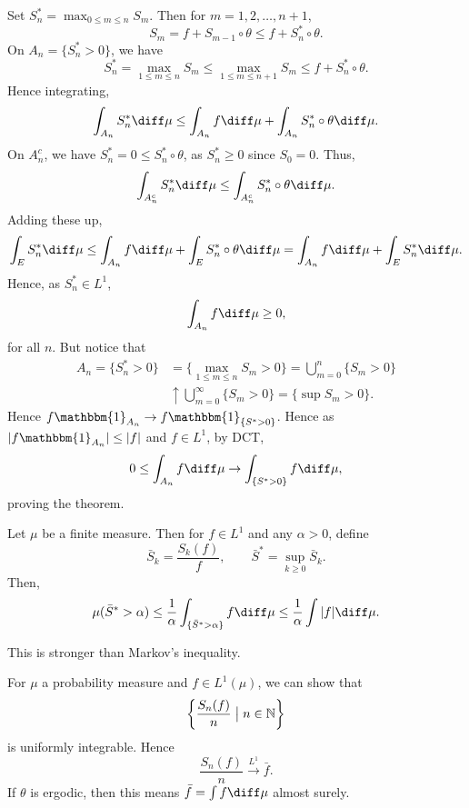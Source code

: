 \documentclass[12pt]{article}
\begin{document}
\begin{proofbox}
	Set $S_n^{\ast} = \max_{0 \leq m \leq n} S_m$. Then for $m = 1, 2, \ldots, n+1$,
	\[
	S_m = f + S_{m-1} \circ \theta \leq f + S_n^{\ast} \circ \theta.
	\]
	On $A_n = \{S_n^{\ast} > 0\}$, we have
	\[
	S_n^{\ast} = \max_{1 \leq m \leq n} S_m \leq \max_{1 \leq m \leq n + 1} S_m \leq f + S_n^{\ast} \circ \theta.
	\]
	Hence integrating,
	\[
	\int_{A_n} S_n^{\ast} \diff \mu \leq \int_{A_n} f \diff \mu + \int_{A_n} S_n^{\ast} \circ \theta \diff \mu.
	\]
	On $A_n^{c}$, we have $S_n^{\ast} = 0 \leq S_n^{\ast} \circ \theta$, as $S_n^{\ast} \geq 0$ since $S_0 = 0$. Thus,
	\[
	\int_{A_n^{c}} S_n^{\ast} \diff \mu \leq \int_{A_n^{c}} S_n^{\ast} \circ \theta \diff \mu.
	\]
	Adding these up,
	\[
	\int_E S_n^{\ast} \diff \mu \leq \int_{A_n} f \diff \mu + \int_E S_n^{\ast} \circ \theta \diff \mu = \int_{A_n} f \diff \mu + \int_E S_n^{\ast} \diff \mu.
	\]
	Hence, as $S_n^{\ast} \in L^1$,
	\[
	\int_{A_n} f \diff \mu \geq 0,
	\]
	for all $n$. But notice that
	\begin{align*}
		A_n = \{S_n^{\ast} > 0\} &= \{ \max_{1 \leq m \leq n} S_m > 0 \} = \bigcup_{m = 0}^{n} \{S_m > 0\} \\
					 &\uparrow \bigcup_{m = 0}^{\infty} \{S_m > 0\} = \{ \sup S_m > 0\}.
	\end{align*}
	Hence $f \mathbbm{1}_{A_n} \to f \mathbbm{1}_{\{S^{\ast} > 0\}}$. Hence as $|f \mathbbm{1}_{A_n}| \leq |f|$ and $f \in L^1$, by DCT,
	\[
		0 \leq \int_{A_n} f \diff \mu \to \int_{\{S^{\ast} > 0\}} f \diff \mu,
	\]
	proving the theorem.
\end{proofbox}

\begin{remark}
	Let $\mu$ be a finite measure. Then for $f \in L^1$ and any $\alpha > 0$, define
	\[
	\bar S_k = \frac{S_k(f)}{f}, \qquad \bar S^{\ast} = \sup_{k \geq 0} \bar S_k.
	\]
	Then,
	\[
		\mu(\bar S^{\ast} > \alpha) \leq \frac{1}{\alpha} \int_{\{\bar S^{\ast} > \alpha\}} f \diff \mu \leq \frac{1}{\alpha} \int |f| \diff \mu.
	\]
\end{remark}

This is stronger than Markov's inequality.

\begin{remark}
	For $\mu$ a probability measure and $f \in L^1(\mu)$, we can show that
	\[
		\biggl\{ \frac{S_n(f)}{n} \bigm| n \in \mathbb{N} \biggr\}
	\]
	is uniformly integrable. Hence
	\[
		\frac{S_n(f)}{n} \overset{L^1}{\to} \bar f.
	\]
	If $\theta$ is ergodic, then this means $\bar f = \int f \diff \mu$ almost surely.
\end{remark}
\end{document}

